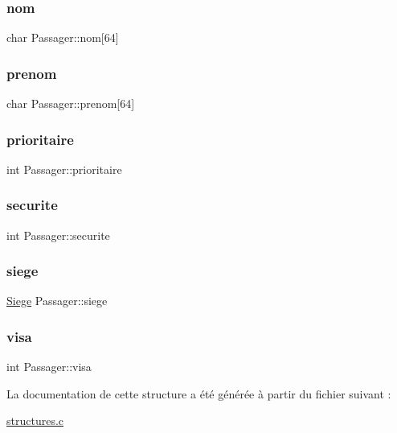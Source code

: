 \subsubsection{\texorpdfstring{nom}{nom}}
{\footnotesize\ttfamily char Passager\+::nom\mbox{[}64\mbox{]}}

\mbox{\label{structPassager_ada9d7b12765e2cca40a8996d09812f56}} 
\subsubsection{\texorpdfstring{prenom}{prenom}}
{\footnotesize\ttfamily char Passager\+::prenom\mbox{[}64\mbox{]}}

\mbox{\label{structPassager_a516754a9134ff8de4a11dcaf520704cc}} 
\subsubsection{\texorpdfstring{prioritaire}{prioritaire}}
{\footnotesize\ttfamily int Passager\+::prioritaire}

\mbox{\label{structPassager_a2bbbc29942279a434417750fa0c90a2a}} 
\subsubsection{\texorpdfstring{securite}{securite}}
{\footnotesize\ttfamily int Passager\+::securite}

\mbox{\label{structPassager_a9c7893faf56c15fb959b8ce49ba507b7}} 
\subsubsection{\texorpdfstring{siege}{siege}}
{\footnotesize\ttfamily \hyperlink{structSiege}{Siege} Passager\+::siege}

\mbox{\label{structPassager_a9452371d86a818c7587937c9ab8b985f}} 
\subsubsection{\texorpdfstring{visa}{visa}}
{\footnotesize\ttfamily int Passager\+::visa}



La documentation de cette structure a été générée à partir du fichier suivant \+:\begin{DoxyCompactItemize}
\item 
\hyperlink{structures_8c}{structures.\+c}\end{DoxyCompactItemize}

